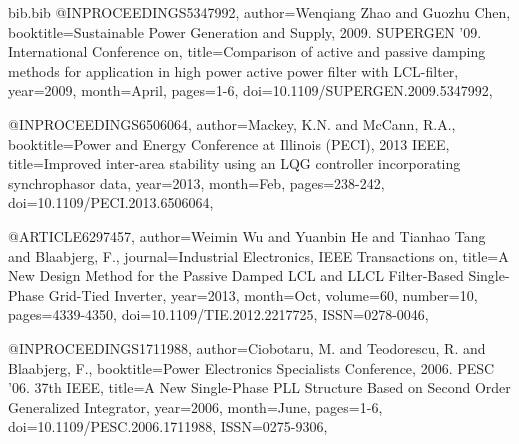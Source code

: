 \begin{filecontents}{bib.bib}
@INPROCEEDINGS{5347992, 
author={Wenqiang Zhao and Guozhu Chen}, 
booktitle={Sustainable Power Generation and Supply, 2009. SUPERGEN '09. International Conference on}, 
title={Comparison of active and passive damping methods for application in high power active power filter with LCL-filter}, 
year={2009}, 
month={April}, 
pages={1-6}, 
doi={10.1109/SUPERGEN.2009.5347992},}

@INPROCEEDINGS{6506064, 
author={Mackey, K.N. and McCann, R.A.}, 
booktitle={Power and Energy Conference at Illinois (PECI), 2013 IEEE}, 
title={Improved inter-area stability using an LQG controller incorporating synchrophasor data}, 
year={2013}, 
month={Feb}, 
pages={238-242}, 
doi={10.1109/PECI.2013.6506064},}

@ARTICLE{6297457, 
author={Weimin Wu and Yuanbin He and Tianhao Tang and Blaabjerg, F.}, 
journal={Industrial Electronics, IEEE Transactions on}, 
title={A New Design Method for the Passive Damped LCL and LLCL Filter-Based Single-Phase Grid-Tied Inverter}, 
year={2013}, 
month={Oct}, 
volume={60}, 
number={10}, 
pages={4339-4350}, 
doi={10.1109/TIE.2012.2217725}, 
ISSN={0278-0046},}

@INPROCEEDINGS{1711988, 
author={Ciobotaru, M. and Teodorescu, R. and Blaabjerg, F.}, 
booktitle={Power Electronics Specialists Conference, 2006. PESC '06. 37th IEEE}, 
title={A New Single-Phase PLL Structure Based on Second Order Generalized Integrator}, 
year={2006}, 
month={June}, 
pages={1-6}, 
doi={10.1109/PESC.2006.1711988}, 
ISSN={0275-9306},}
\end{filecontents}